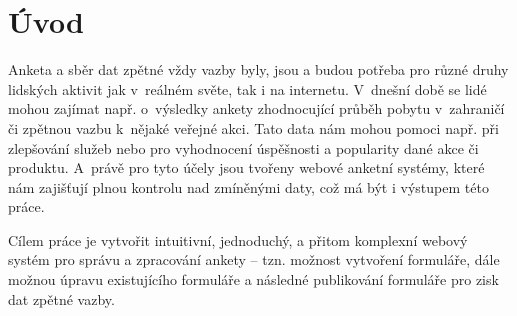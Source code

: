 \chapter{Úvod}

Anketa a sběr dat zpětné vždy vazby byly, jsou a budou potřeba pro různé druhy lidských aktivit jak v~reálném světe, tak i na internetu. V~dnešní době se lidé mohou zajímat např. o~výsledky ankety zhodnocující průběh pobytu v~zahraničí či zpětnou vazbu k~nějaké veřejné akci. Tato data nám mohou pomoci např. při zlepšování služeb nebo pro vyhodnocení úspěšnosti a popularity dané akce či produktu. A~právě pro tyto účely jsou tvořeny webové anketní systémy, které nám zajišťují plnou kontrolu nad zmíněnými daty, což má být i výstupem této práce.

Cílem práce je vytvořit intuitivní, jednoduchý, a přitom komplexní webový systém pro správu a zpracování ankety – tzn. možnost vytvoření formuláře, dále možnou úpravu existujícího formuláře a následné publikování formuláře pro zisk dat zpětné vazby.
